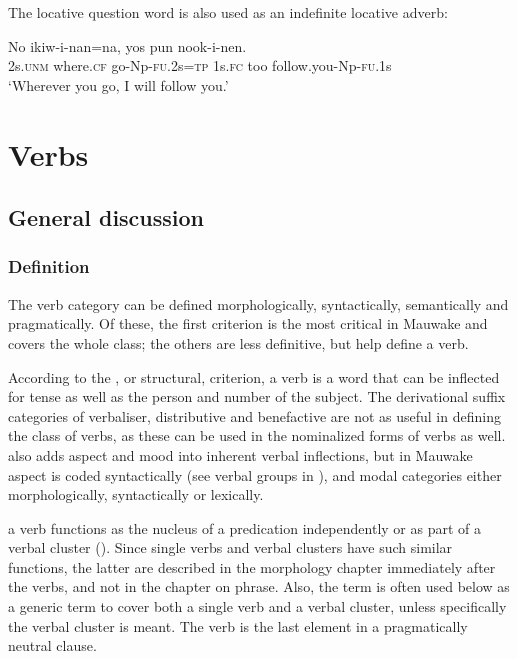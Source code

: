 The locative question word  is also used as an indefinite locative adverb:

\ea%
\label{ex:x1869}
\gll No  ikiw-i-nan=na, yos pun nook-i-nen. \\
2s.\textsc{unm} where.\textsc{cf} go-Np-\textsc{fu}.2s=\textsc{tp} 1s.\textsc{fc} too follow.you-Np-\textsc{fu}.1s\\
\glt`Wherever you go, I will follow you.'
\z

\section{Verbs}
{}
\subsection{General discussion}
{}
\subsubsection[Definition]{Definition}
{}
The verb category can be defined morphologically, syntactically, semantically and pragmatically. Of these, the first criterion is the most critical in Mauwake and covers the whole class; the others are less definitive, but help define a  verb.

According to the , or structural, criterion, a verb is a word that can be inflected for tense as well as the person and number of the subject. The derivational suffix categories of verbaliser, distributive and benefactive are not as useful in defining the class of verbs, as these can be used in the nominalized forms of verbs as well. \citet[190]{Anderson1985b} also adds aspect and mood into inherent verbal inflections, but in Mauwake aspect is coded syntactically (see verbal groups in ), and modal categories either morphologically, syntactically or lexically.

 a verb functions as the nucleus of a predication independently or as part of a verbal cluster (). Since single verbs and verbal clusters have such similar functions, the latter are described in the morphology chapter immediately after the verbs, and not in the chapter on phrase. Also, the term  is often used below as a generic term to cover both a single verb and a verbal cluster, unless specifically the verbal cluster is meant. The verb is the last element in a pragmatically neutral clause.

